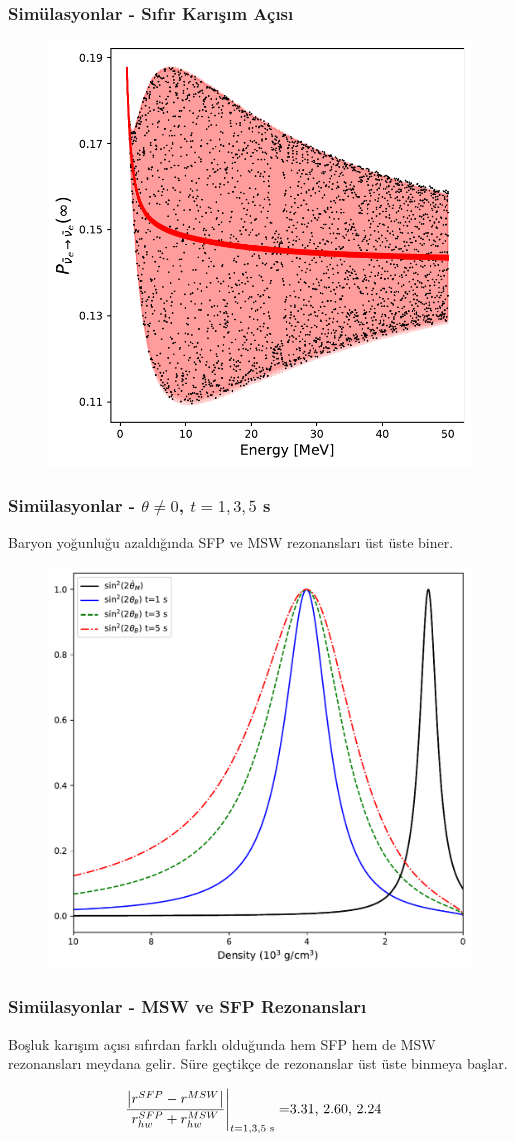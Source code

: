 \documentclass[10pt]{beamer}
\begin{document}
\begin{frame}
    \frametitle{Simülasyonlar - Sıfır Karışım Açısı}
    \begin{figure}[hbt!]
        \centering
        \includegraphics[width=.6\textwidth]{fig/5.pdf}
    \end{figure}
\end{frame}

\begin{frame}
    \frametitle{Simülasyonlar - $\theta\ne0$, $t=1,3,5$ s}
    Baryon yoğunluğu azaldığında SFP ve MSW rezonansları üst üste biner.
    \begin{figure}[hbt!]
        \centering
        \includegraphics[width=.7\textwidth]{fig/widthCompare3_nbInverted_40MeV_IH_t135s_sqr_croped.pdf}
    \end{figure}

\end{frame}

\begin{frame}[noframenumbering]
    \frametitle{Simülasyonlar - MSW ve SFP Rezonansları}
    
    Boşluk karışım açısı sıfırdan farklı olduğunda hem SFP hem de MSW rezonansları meydana gelir. Süre geçtikçe de rezonanslar üst üste binmeya başlar.

    \begin{align*}
        \eval{\frac{\abs{r^{SFP} - r^{MSW}}}{r^{SFP}_{hw}+r^{MSW}_{hw}}}_{t=1,3,5 \text{ s}} =& 3.31\text{, } 2.60\text{, } 2.24
    \end{align*}
\end{frame}
\end{document}
